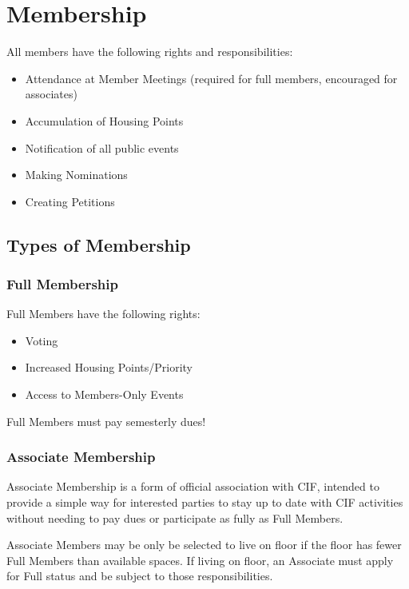 \section{Membership}
\label{sec:membership}

All members have the following rights and responsibilities:

\begin{itemize}
	\item Attendance at Member Meetings (required for full members, encouraged for associates)
	\item Accumulation of Housing Points
	\item Notification of all public events
	\item Making Nominations
	\item Creating Petitions
\end{itemize}



	\subsection{Types of Membership}



		\subsubsection{Full Membership}

		Full Members have the following rights:

		\begin{itemize}
			\item Voting
			\item Increased Housing Points/Priority
			\item Access to Members-Only Events
		\end{itemize}

		Full Members must pay semesterly dues!
		


		\subsubsection{Associate Membership}

		Associate Membership is a form of official association with CIF, intended to provide a simple way for interested parties to stay up to date with CIF activities without needing to pay dues or participate as fully as Full Members.

Associate Members may be only be selected to live on floor if the floor has fewer Full Members than available spaces. If living on floor, an Associate must apply for Full status and be subject to those responsibilities.



